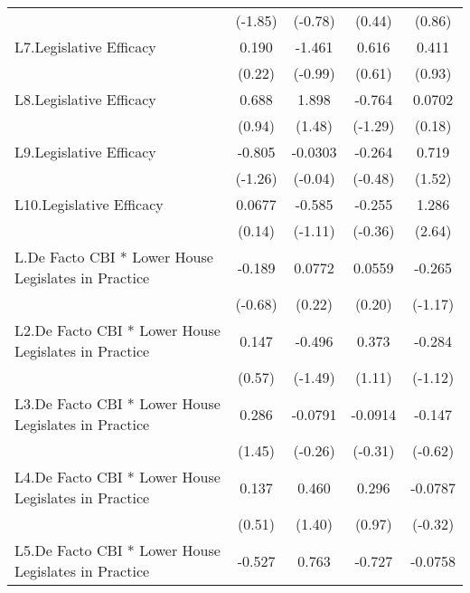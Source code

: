 {\begin{longtable}{l*{4}{c}}
                &  (-1.85)         &  (-0.78)         &   (0.44)         &   (0.86)         \\
[1em]
L7.Legislative Efficacy&    0.190         &   -1.461         &    0.616         &    0.411         \\
                &   (0.22)         &  (-0.99)         &   (0.61)         &   (0.93)         \\
[1em]
L8.Legislative Efficacy&    0.688         &    1.898         &   -0.764         &   0.0702         \\
                &   (0.94)         &   (1.48)         &  (-1.29)         &   (0.18)         \\
[1em]
L9.Legislative Efficacy&   -0.805         &  -0.0303         &   -0.264         &    0.719         \\
                &  (-1.26)         &  (-0.04)         &  (-0.48)         &   (1.52)         \\
[1em]
L10.Legislative Efficacy&   0.0677         &   -0.585         &   -0.255         &    1.286\sym{**} \\
                &   (0.14)         &  (-1.11)         &  (-0.36)         &   (2.64)         \\
[1em]
L.De Facto CBI * Lower House Legislates in Practice&   -0.189         &   0.0772         &   0.0559         &   -0.265         \\
                &  (-0.68)         &   (0.22)         &   (0.20)         &  (-1.17)         \\
[1em]
L2.De Facto CBI * Lower House Legislates in Practice&    0.147         &   -0.496         &    0.373         &   -0.284         \\
                &   (0.57)         &  (-1.49)         &   (1.11)         &  (-1.12)         \\
[1em]
L3.De Facto CBI * Lower House Legislates in Practice&    0.286         &  -0.0791         &  -0.0914         &   -0.147         \\
                &   (1.45)         &  (-0.26)         &  (-0.31)         &  (-0.62)         \\
[1em]
L4.De Facto CBI * Lower House Legislates in Practice&    0.137         &    0.460         &    0.296         &  -0.0787         \\
                &   (0.51)         &   (1.40)         &   (0.97)         &  (-0.32)         \\
[1em]
L5.De Facto CBI * Lower House Legislates in Practice&   -0.527\sym{*}  &    0.763         &   -0.727\sym{**} &  -0.0758         \\

\end{longtable}}
